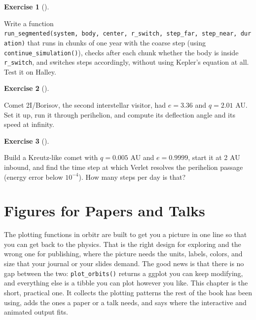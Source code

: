 \documentclass[
  10.5pt,
  letterpaper,
]{scrbook}
\theoremstyle{definition}
\newtheorem{exercise}{Exercise}[chapter]
\theoremstyle{plain}
\theoremstyle{remark}
\begin{document}
\begin{exercise}[]\protect\hypertarget{exr-ch13-loop}{}\label{exr-ch13-loop}

Write a function
\texttt{run\_segmented(system,\ body,\ center,\ r\_switch,\ step\_far,\ step\_near,\ duration)}
that runs in chunks of one year with the coarse step (using
\texttt{continue\_simulation()}), checks after each chunk whether the
body is inside \texttt{r\_switch}, and switches steps accordingly,
without using Kepler's equation at all. Test it on Halley.

\end{exercise}

\begin{exercise}[]\protect\hypertarget{exr-ch13-borisov}{}\label{exr-ch13-borisov}

Comet 2I/Borisov, the second interstellar visitor, had \(e = 3.36\) and
\(q = 2.01\) AU. Set it up, run it through perihelion, and compute its
deflection angle and its speed at infinity.

\end{exercise}

\begin{exercise}[]\protect\hypertarget{exr-ch13-sungrazer}{}\label{exr-ch13-sungrazer}

Build a Kreutz-like comet with \(q = 0.005\) AU and \(e = 0.9999\),
start it at 2 AU inbound, and find the time step at which Verlet
resolves the perihelion passage (energy error below \(10^{-4}\)). How
many steps per day is that?

\end{exercise}

\chapter{Figures for Papers and Talks}\label{sec-figures}

The plotting functions in orbitr are built to get you a picture in one
line so that you can get back to the physics. That is the right design
for exploring and the wrong one for publishing, where the picture needs
the units, labels, colors, and size that your journal or your slides
demand. The good news is that there is no gap between the two:
\texttt{plot\_orbits()} returns a ggplot you can keep modifying, and
everything else is a tibble you can plot however you like. This chapter
is the short, practical one. It collects the plotting patterns the rest
of the book has been using, adds the ones a paper or a talk needs, and
says where the interactive and animated output fits.
\end{document}
